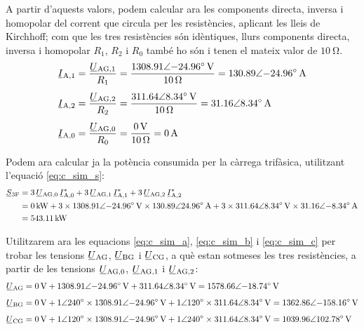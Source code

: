 \begin{exemple}
    A partir d'aquests valors, podem calcular ara les components
    directa, inversa i homopolar del corrent que circula per les
    resistències, aplicant les lleis de Kirchhoff; com que les tres resistències són idèntiques, llurs  components    directa, inversa i homopolar $R_1$,  $R_2$ i $R_0$ també ho són i tenen el mateix valor de $\qty{10}{\ohm}$.
    \begin{align*}
    \cmplx{I}\ped{A,1} &=
    \frac{\cmplx{U}\ped{AG,1}}{R_1} =
    \frac{\complexqty{1308,91:-24,96}{V}}{\qty{10}{\ohm}} =
    \complexqty{130,89:-24,96}{A} \\[1ex]
    \cmplx{I}\ped{A,2} &=
    \frac{\cmplx{U}\ped{AG,2}}{R_2} =
    \frac{\complexqty{311,64:8,34}{V}}{\qty{10}{\ohm}} =
    \complexqty{31,16:8,34}{A} \\[1ex]
    \cmplx{I}\ped{A,0} &=
    \frac{\cmplx{U}\ped{AG,0}}{R_0} =
    \frac{\qty{0}{V}}{\qty{10}{\ohm}} =
    \qty{0}{A}
    \end{align*}

    Podem ara  calcular ja  la potència consumida per la càrrega
    trifàsica, utilitzant l'equació \eqref{eq:c_sim_s}:
    \[
    \begin{split}
    \cmplx{S}\ped{3F} &=  3\,
    \cmplx{U}\ped{AG,0}\,  \cmplx{I}\ped{A,0}^* +
    3\, \cmplx{U}\ped{AG,1}\,
    \cmplx{I}\ped{A,1}^* + 3\, \cmplx{U}\ped{AG,2}\,
    \cmplx{I}\ped{A,2}^*   \\
    &= \qty{0}{kW} + 3 \times \complexqty{1308,91:-24,96}{V} \times
    \complexqty{130,89:24,96}{A} + 3 \times
    \complexqty{311,64:8,34}{V} \times \complexqty{31,16:-8,34}{A}  \\
    &= \qty{543,11}{kW}
    \end{split}
    \]

    Utilitzarem ara les equacions \eqref{eq:c_sim_a},
    \eqref{eq:c_sim_b} i \eqref{eq:c_sim_c} per trobar les tensions $\cmplx{U}\ped{AG}$, $\cmplx{U}\ped{BG}$ i $\cmplx{U}\ped{CG}$, a què
    estan sotmeses les tres resistències, a partir de les  tensions $\cmplx{U}\ped{AG,0}$, $\cmplx{U}\ped{AG,1}$ i $\cmplx{U}\ped{AG,2}$:
    \begin{align*}
        \cmplx{U}\ped{AG} &= \qty{0}{V} + \complexqty{1308,91:-24,96}{V} +
        \complexqty{311,64:8,34}{V}  =
        \complexqty{1578,66:-18,74}{V} \\[1ex]
        \cmplx{U}\ped{BG} &= \qty{0}{V} + \complexnum{1:240} \times
        \complexqty{1308,91:-24,96}{V} +
        \complexnum{1:120} \times
        \complexqty{311,64:8,34}{V}  =
        \complexqty{1362,86:-158,16}{V}    \\[1ex]
        \cmplx{U}\ped{CG} &= \qty{0}{V} + \complexnum{1:120} \times
        \complexqty{1308,91:-24,96}{V} +
        \complexnum{1:240} \times \complexqty{311,64:8,34}{V}  =
        \complexqty{1039,96:102,78}{V}
    \end{align*}


\end{exemple}
